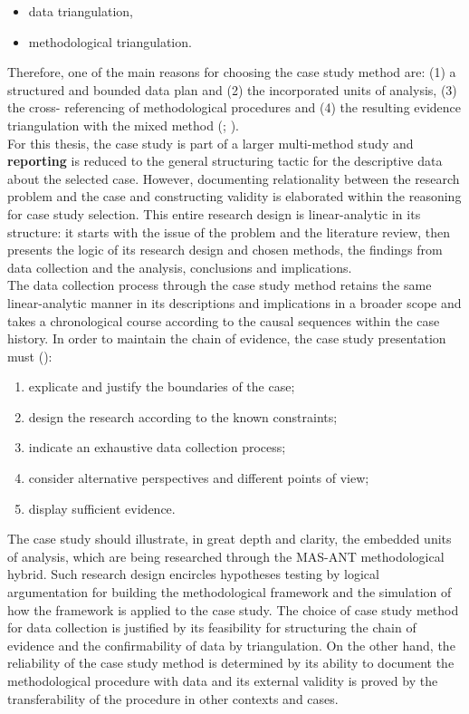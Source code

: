 \documentclass[11pt]{report}
\begin{document}
\begin{itemize}
\item data triangulation,
\item methodological triangulation. 
\end{itemize}

Therefore, one of the main reasons for choosing the case study method are: (1) a structured and bounded data plan and (2) the incorporated units of analysis, (3) the cross- referencing of methodological procedures and (4) the resulting evidence triangulation with the mixed method (\href{Patton}{\citealt{patton_how_1987}}; \href{Yin} {\citealt{yin_case_2009}}).
\\

For this thesis, the case study is part of a larger multi-method study and \textbf{reporting} is reduced to the general structuring tactic for the descriptive data about the selected case.
However, documenting relationality between the research problem and the case and constructing validity is elaborated within the reasoning for case study selection.
This entire research design is linear-analytic in its structure: it starts with the issue of the problem and the literature review, then presents the logic of its research design and chosen methods, the findings from data collection and the analysis, conclusions and implications.
\\

The data collection process through the case study method retains the same linear-analytic manner in its descriptions and implications in a broader scope and takes a chronological course according to the causal sequences within the case history. In order to maintain the chain of evidence, the case study presentation must (\href{Yin} {\citealt{yin_case_2009}}):

\begin{enumerate}
\item explicate and justify the boundaries of the case;
\item design the research according to the known constraints;
\item indicate an exhaustive data collection process;
\item consider alternative perspectives and different points of view;
\item display sufficient evidence.
\end{enumerate}

The case study should illustrate, in great depth and clarity, the embedded units of analysis, which are being researched through the MAS-ANT methodological hybrid. Such research design encircles hypotheses testing by logical argumentation for building the methodological framework and the simulation of how the framework is applied to the case study. The choice of case study method for data collection is justified by its feasibility for structuring the chain of evidence and the confirmability of data by triangulation. On the other hand, the reliability of the case study method is determined by its ability to document the methodological procedure with data and its external validity is proved by the transferability of the procedure in other contexts and cases.
\\
\end{document}
